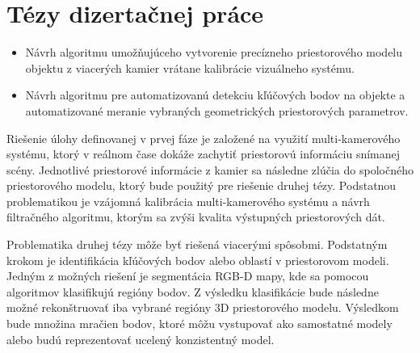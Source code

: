 \chapter{Tézy dizertačnej práce}
\label{kap:tezy}
\pagestyle{fancy}
\fancyhf{}
\fancyfoot[CE,CO]{\thepage}
\renewcommand{\footrulewidth}{1pt}



\begin{itemize}
	\item Návrh algoritmu umožňujúceho vytvorenie precízneho priestorového modelu objektu z viacerých kamier vrátane kalibrácie vizuálneho systému.
	\item Návrh algoritmu pre automatizovanú detekciu kľúčových bodov na objekte a automatizované meranie vybraných geometrických priestorových parametrov.
\end{itemize}



Riešenie úlohy definovanej v prvej fáze je založené na využití multi-kamerového systému, ktorý v reálnom čase dokáže zachytiť priestorovú informáciu snímanej scény. Jednotlivé priestorové informácie z kamier sa následne zlúčia do spoločného priestorového modelu, ktorý bude použitý pre riešenie druhej tézy.
Podstatnou problematikou je vzájomná kalibrácia multi-kamerového systému a návrh filtračného algoritmu, ktorým sa zvýši kvalita výstupných priestorových dát. 

Problematika druhej tézy môže byť riešená viacerými spôsobmi. Podstatným krokom je identifikácia kľúčových bodov alebo oblastí v priestorovom modeli. Jedným z možných riešení je segmentácia RGB-D mapy, kde sa pomocou algoritmov klasifikujú regióny bodov. Z výsledku klasifikácie bude následne možné rekonštruovať iba vybrané regióny 3D priestorového modelu. Výsledkom bude množina mračien bodov, ktoré môžu vystupovať ako samostatné modely alebo budú reprezentovať ucelený konzistentný model.




